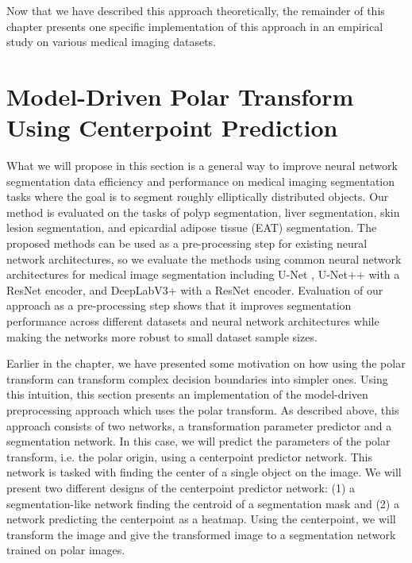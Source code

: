 Now that we have described this approach theoretically, the remainder of this chapter presents one specific implementation of this approach in an empirical study on various medical imaging datasets.

\section{Model-Driven Polar Transform Using Centerpoint Prediction}

What we will propose in this section is a general way to improve neural network segmentation data efficiency and performance 
on medical imaging segmentation tasks where the goal is to segment roughly 
elliptically distributed objects. Our method is evaluated on 
the tasks of polyp segmentation, liver segmentation, skin 
lesion segmentation, and epicardial adipose tissue (EAT) segmentation.
The proposed methods can be used as a pre-processing step for 
existing neural network architectures, so we evaluate the methods using
common neural network architectures for medical image segmentation including U-Net 
\cite{ronnebergerUNetConvolutionalNetworks2015}, U-Net++ 
\cite{zhou2019unetplusplus} with a ResNet \cite{heDeepResidualLearning2016} encoder, and DeepLabV3+ \cite{chenEncoderDecoderAtrousSeparable2018} with a ResNet \cite{heDeepResidualLearning2016} encoder. Evaluation of our approach as a pre-processing step shows that it improves segmentation performance across different datasets and neural network architectures while making the networks more robust to small dataset sample sizes.

Earlier in the chapter, we have presented some motivation on how using the polar transform can transform complex decision boundaries into simpler ones. Using this intuition, this section presents an implementation of the model-driven preprocessing approach which uses the polar transform. As described above, this approach consists of two networks, a transformation parameter predictor and a segmentation network. In this case, we will predict the parameters of the polar transform, i.e. the polar origin, using a centerpoint predictor network. This network is tasked with finding the center of a single object on the image. We will present two different designs of the centerpoint predictor network: (1)
a segmentation-like network finding the centroid of a segmentation mask and (2) a network predicting the centerpoint as a heatmap. Using the centerpoint, we will transform the image and give the transformed image to a segmentation network trained on polar images.

